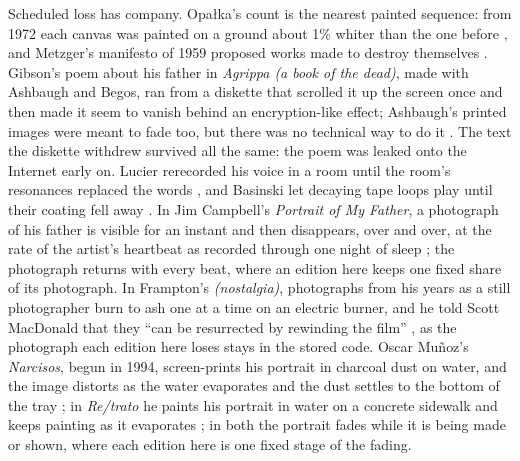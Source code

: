 \documentclass[11pt]{article}
\begin{document}
Scheduled loss has company. Opa{\l}ka's count is the nearest painted sequence: from 1972 each canvas was painted on a ground about 1\% whiter than the one before \citep{opalka1965}, and Metzger's manifesto of 1959 proposed works made to destroy themselves \citep{metzger1959}. Gibson's poem about his father in \emph{Agrippa (a book of the dead)}, made with Ashbaugh and Begos, ran from a diskette that scrolled it up the screen once and then made it seem to vanish behind an encryption-like effect; Ashbaugh's printed images were meant to fade too, but there was no technical way to do it \citep{gibson1992}. The text the diskette withdrew survived all the same: the poem was leaked onto the Internet early on. Lucier rerecorded his voice in a room until the room's resonances replaced the words \citep{lucier1969}, and Basinski let decaying tape loops play until their coating fell away \citep{basinski2002}. In Jim Campbell's \emph{Portrait of My Father}, a photograph of his father is visible for an instant and then disappears, over and over, at the rate of the artist's heartbeat as recorded through one night of sleep \citep{campbell1994}; the photograph returns with every beat, where an edition here keeps one fixed share of its photograph. In Frampton's \emph{(nostalgia)}, photographs from his years as a still photographer burn to ash one at a time on an electric burner, and he told Scott MacDonald that they ``can be resurrected by rewinding the film'' \citep{frampton1971}, as the photograph each edition here loses stays in the stored code. Oscar Mu{\~n}oz's \emph{Narcisos}, begun in 1994, screen-prints his portrait in charcoal dust on water, and the image distorts as the water evaporates and the dust settles to the bottom of the tray \citep{munoz1994}; in \emph{Re/trato} he paints his portrait in water on a concrete sidewalk and keeps painting as it evaporates \citep{munoz2003}; in both the portrait fades while it is being made or shown, where each edition here is one fixed stage of the fading.
\end{document}
